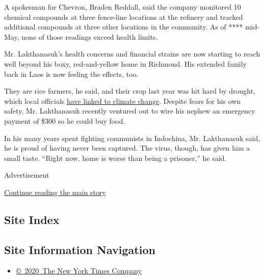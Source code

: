 A spokesman for Chevron, Braden Reddall, said the company monitored 10
chemical compounds at three fence-line locations at the refinery and
tracked additional compounds at three other locations in the community.
As of **** mid-May, none of those readings exceed health limits.

Mr. Lakthanasuk's health concerns and financial strains are now starting
to reach well beyond his boxy, red-and-yellow home in Richmond. His
extended family back in Laos is now feeling the effects, too.

They are rice farmers, he said, and their crop last year was hit hard by
drought, which local officials
\href{https://en.vietnamplus.vn/lao-ministry-blames-recent-droughts-on-climate-change/165553.vnp}{have
linked to climate change}. Despite fears for his own safety, Mr.
Lakthanasuk recently ventured out to wire his nephew an emergency
payment of \$300 so he could buy food.

In his many years spent fighting communists in Indochina, Mr.
Lakthanasuk said, he is proud of having never been captured. The virus,
though, has given him a small taste. ``Right now, home is worse than
being a prisoner,'' he said.

Advertisement

\protect\hyperlink{after-bottom}{Continue reading the main story}

\hypertarget{site-index}{%
\subsection{Site Index}\label{site-index}}

\hypertarget{site-information-navigation}{%
\subsection{Site Information
Navigation}\label{site-information-navigation}}

\begin{itemize}
\tightlist
\item
  \href{https://help.nytimes.com/hc/en-us/articles/115014792127-Copyright-notice}{©~2020~The
  New York Times Company}
\end{itemize}

